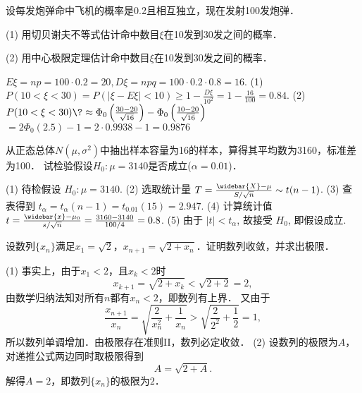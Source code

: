 \documentclass{njustexam}
\begin{document}
\bigskip

\begin{problem}
设每发炮弹命中飞机的概率是0.2且相互独立，现在发射100发炮弹．\par
(1) 用切贝谢夫不等式估计命中数目$\xi$在10发到30发之间的概率．\par
(2) 用中心极限定理估计命中数目$\xi$在10发到30发之间的概率．
\end{problem}

\smallskip

\begin{solution}
$E\xi = n p = 100 \cdot 0.2 = 20, D\xi = n p q = 100 \cdot 0.2 \cdot 0.8 = 16$. 
(1) $P (10 < \xi < 30) = P (|\xi - E\xi| < 10) \ge 1 - \frac{D\xi}{10^2}
     = 1 - \frac{16}{100} = 0.84$. 
(2) $P (10 < \xi < 30) \? \approx \Phi_0\left(\frac{30 - 20}{\sqrt{16}}\right)
         - \Phi_0\left(\frac{10 - 20}{\sqrt{16}}\right)$ 
      \+ $= 2 \Phi_0(2.5) - 1 = 2 \cdot 0.9938 - 1 =0.9876$ 
\end{solution}

\bigskip

\begin{problem}
从正态总体$N(\mu,\sigma^2)$中抽出样本容量为16的样本，算得其平均数为3160，标准差为100．
试检验假设$H_0:\mu=3140$是否成立($\alpha = 0.01$)．
\end{problem}

\smallskip

\begin{solution}
(1) 待检假设 $H_0 : \mu = 3140$. 
(2) 选取统计量 $T = \frac{\widebar{X}-\mu}{S / \sqrt{n}} \sim t(n-1)$. 
(3) 查表得到 $t_{\alpha} = t_{\alpha} (n - 1) = t_{0.01} (15) =2.947$. 
(4) 计算统计值 $t = \frac{\widebar{x} - \mu_0}{s/\sqrt{n}} =\frac{3160-3140}{100/4} = 0.8$.
(5) 由于 $| t | < t_{\alpha}$, 故接受 $H_0$, 即假设成立. 
\end{solution}

\bigskip



\renewcommand{\solutionname}{证} %

\begin{problem}
设数列$\{x_n\}$满足$x_1=\sqrt2$，$x_{n+1}=\sqrt{2+x_n}$．证明数列收敛，并求出极限．
\end{problem}

\smallskip

\begin{solution}
(1) 事实上，由于$x_1<2$，且$x_k<2$时
$$x_{k+1}=\sqrt{2+x_k}<\sqrt{2+2}=2,$$
由数学归纳法知对所有$n$都有$x_n<2$，即数列有上界．
又由于
$$\frac{x_{n+1}}{x_n}=\sqrt{\frac{2}{x_n^2}+\frac{1}{x_n}}>\sqrt{\frac{2}{2^2}+\frac{1}{2}}=1,$$
所以数列单调增加．由极限存在准则II，数列必定收敛．
(2) 设数列的极限为$A$，对递推公式两边同时取极限得到
$$A=\sqrt{2+A}.$$
解得$A=2$，即数列$\{x_n\}$的极限为$2$．
\end{solution}
\end{document}

